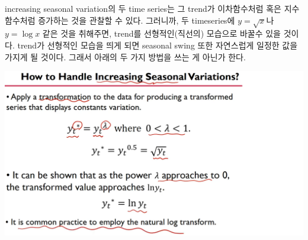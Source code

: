 \documentclass{article}
\begin{document}
increasing seasonal variation의 두 time series는 그 trend가 이차함수처럼 혹은 지수함수처럼 증가하는 것을 관찰할 수 있다.
그러니까, 두 timeseries에 \(y=\sqrt x\)나 \(y=\log x\) 같은 것을 취해주면, trend를 선형적인(직선의) 모습으로 바꿀수 있을 것이다.
trend가 선형적인 모습을 띄게 되면 seasonal swing 또한 자연스럽게 일정한 값을 가지게 될 것이다.
그래서 아래의 두 가지 방법을 쓰는 게 아닌가 한다.
\begin{center}
\includegraphics[width=.5\textwidth]{two_transforms}
\end{center}
\end{document}

